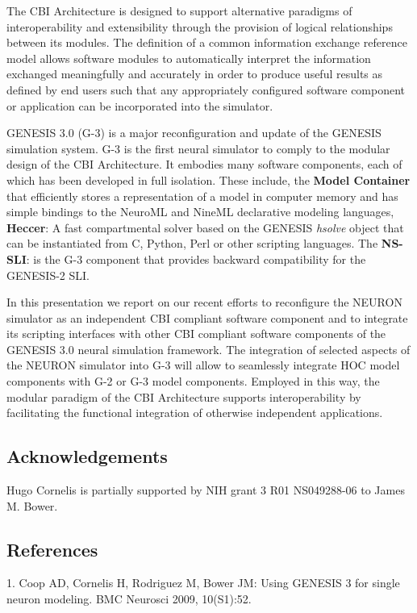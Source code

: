 \documentclass[12pt]{article}
\begin{document}
The CBI Architecture is designed to support alternative paradigms of interoperability and extensibility through the provision of logical relationships between its modules.  The definition of a common information exchange reference model allows software modules to automatically interpret the information exchanged meaningfully and accurately in order to produce useful results as defined by end users such that any appropriately configured software component or application can be incorporated into the simulator.

GENESIS 3.0 (G-3) is a major reconfiguration and update of the GENESIS simulation system.  G-3 is the first neural simulator to comply to the modular design of the CBI Architecture.  It embodies many software components, each of which has been developed in full isolation.  These include, the {\bf Model Container} that efficiently stores a representation of a model in computer memory and has simple bindings to the NeuroML and NineML declarative modeling languages, {\bf Heccer}: A fast compartmental solver based on the GENESIS {\it hsolve} object that can be instantiated from C, Python, Perl or other scripting languages.  The {\bf NS-SLI}: is the G-3 component that provides backward compatibility for the GENESIS-2 SLI.

In this presentation we report on our recent efforts to reconfigure the NEURON simulator as an independent CBI compliant software component and to integrate its scripting interfaces with other CBI compliant software components of the GENESIS 3.0 neural simulation framework.  The integration of selected aspects of the NEURON simulator into G-3 will allow to seamlessly integrate HOC model components with G-2 or G-3 model components.  Employed in this way, the modular paradigm of the CBI Architecture supports interoperability by facilitating the functional integration of otherwise independent applications.


\subsection*{Acknowledgements}
Hugo Cornelis is partially supported by NIH grant 3 R01 NS049288-06 to
James M. Bower.


\subsection*{References}
1. Coop AD, Cornelis H, Rodriguez M, Bower JM: Using GENESIS 3 for single neuron modeling. BMC Neurosci 2009, 10(S1):52.
\end{document}
